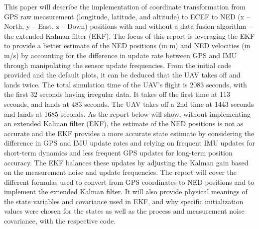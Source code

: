 This paper will describe the implementation of coordinate transformation from GPS raw measurement (longitude, latitude, and altitude) to ECEF to NED (x – North, y – East, z – Down) positions with and without a data fusion algorithm – the extended Kalman filter (EKF). The focus of this report is leveraging the EKF to provide a better estimate of the NED positions (in m) and NED velocities (in m/s) by accounting for the difference in update rate between GPS and IMU through manipulating the sensor update frequencies. From the initial code provided and the default plots, it can be deduced that the UAV takes off and lands twice. The total simulation time of the UAV’s flight is 2083 seconds, with the first 32 seconds having irregular data. It takes off the first time at 113 seconds, and lands at 483 seconds. The UAV takes off a 2nd time at 1443 seconds and lands at 1685 seconds. As the report below will show, without implementing an extended Kalman filter (EKF), the estimate of the NED positions is not as accurate and the EKF provides a more accurate state estimate by considering the difference in GPS and IMU update rates and relying on frequent IMU updates for short-term dynamics and less frequent GPS updates for long-term position accuracy. The EKF balances these updates by adjusting the Kalman gain based on the measurement noise and update frequencies. The report will cover the different formulas used to convert from GPS coordinates to NED positions and to implement the extended Kalman filter. It will also provide physical meanings of the state variables and covariance used in EKF, and why specific initialization values were chosen for the states as well as the process and measurement noise covariance, with the respective code.